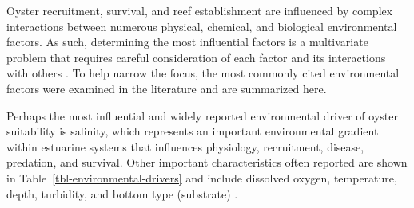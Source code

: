 \documentclass[
  review]{elsarticle}
\begin{document}
Oyster recruitment, survival, and reef establishment are influenced by
complex interactions between numerous physical, chemical, and biological
environmental factors. As such, determining the most influential factors
is a multivariate problem that requires careful consideration of each
factor and its interactions with others
\citep{LaPeyre2021, Pollack2012, Barnes2007, Christensen1997}. To help
narrow the focus, the most commonly cited environmental factors were
examined in the literature and are summarized here.

Perhaps the most influential and widely reported environmental driver of
oyster suitability is salinity, which represents an important
environmental gradient within estuarine systems that influences
physiology, recruitment, disease, predation, and survival. Other
important characteristics often reported are shown in
Table~\ref{tbl-environmental-drivers} and include dissolved oxygen,
temperature, depth, turbidity, and bottom type (substrate)
\citep{LaPeyre2021, Pollack2012, Barnes2007, Geselbracht2024, Christensen1997}.
\end{document}

